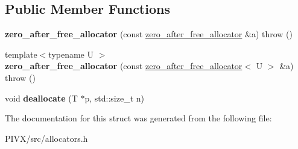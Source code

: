 \subsection*{Public Member Functions}
\begin{DoxyCompactItemize}
\item 
\mbox{\label{structzero__after__free__allocator_a2822b64128f40c3b54ed6dbbf258730b}} 
{\bfseries zero\+\_\+after\+\_\+free\+\_\+allocator} (const \mbox{\hyperlink{structzero__after__free__allocator}{zero\+\_\+after\+\_\+free\+\_\+allocator}} \&a)  throw ()
\item 
\mbox{\label{structzero__after__free__allocator_a9d83915e027c0be7b08d6e5e8e4424ba}} 
{\footnotesize template$<$typename U $>$ }\\{\bfseries zero\+\_\+after\+\_\+free\+\_\+allocator} (const \mbox{\hyperlink{structzero__after__free__allocator}{zero\+\_\+after\+\_\+free\+\_\+allocator}}$<$ U $>$ \&a)  throw ()
\item 
\mbox{\label{structzero__after__free__allocator_a63a1610931a9656c9373bf5dce2db796}} 
void {\bfseries deallocate} (T $\ast$p, std\+::size\+\_\+t n)
\end{DoxyCompactItemize}


The documentation for this struct was generated from the following file\+:\begin{DoxyCompactItemize}
\item 
P\+I\+V\+X/src/allocators.\+h\end{DoxyCompactItemize}
